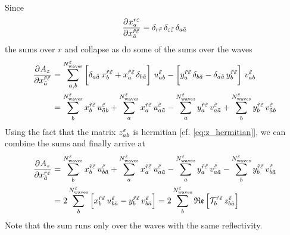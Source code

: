 Since
\begin{equation}
  \label{eq:likelihood_function_par_deriv}
  \dpd{x_a^{r \refl}}{{x_{\tilde{a}}^{\tilde{r} \tilde{\refl}}}}
  = \delta_{r \tilde{r}}\, \delta_{\refl \tilde{\refl}}\, \delta_{a \tilde{a}}
\end{equation}
the sums over $r$ and  collapse as do some of the sums over the waves
\begin{align}
  \dpd{A_z}{{x_{\tilde{a}}^{\tilde{r} \tilde{\refl}}}}
  &= \sum_{a, b}^{N^{\tilde{\refl}}_\text{waves}}
  \sBrk[3]{\delta_{a \tilde{a}}\, x_b^{\tilde{r} \tilde{\refl}}
    + x_a^{\tilde{r} \tilde{\refl}}\, \delta_{b \tilde{a}}}\, u^{\tilde{\refl}}_{a b}
  - \sBrk[3]{y_a^{\tilde{r} \tilde{\refl}}\, \delta_{b \tilde{a}}
    - \delta_{a \tilde{a}}\, y_b^{\tilde{r} \tilde{\refl}}}\, v^{\tilde{\refl}}_{a b} \\
  &= \sum_{b}^{N^{\tilde{\refl}}_\text{waves}} x_b^{\tilde{r} \tilde{\refl}}\, u^{\tilde{\refl}}_{\tilde{a} b}
    + \sum_{a}^{N^{\tilde{\refl}}_\text{waves}} x_a^{\tilde{r} \tilde{\refl}}\, u^{\tilde{\refl}}_{a \tilde{a}}
  - \sum_{a}^{N^{\tilde{\refl}}_\text{waves}} y_a^{\tilde{r} \tilde{\refl}}\, v^{\tilde{\refl}}_{a \tilde{a}}
    + \sum_{b}^{N^{\tilde{\refl}}_\text{waves}} y_b^{\tilde{r} \tilde{\refl}}\, v^{\tilde{\refl}}_{\tilde{a} b}
\end{align}
Using the fact that the matrix $z^\varepsilon_{a b}$ is hermitian
[cf. \cref{eq:z_hermitian}], we can combine the sums and finally arrive
at
\begin{align}
  \dpd{A_z}{{x_{\tilde{a}}^{\tilde{r} \tilde{\refl}}}}
  &= \sum_{b}^{N^{\tilde{\refl}}_\text{waves}} x_b^{\tilde{r} \tilde{\refl}}\, u^{\tilde{\refl}}_{b \tilde{a}}
    + \sum_{a}^{N^{\tilde{\refl}}_\text{waves}} x_a^{\tilde{r} \tilde{\refl}}\, u^{\tilde{\refl}}_{a \tilde{a}}
  - \sum_{a}^{N^{\tilde{\refl}}_\text{waves}} y_a^{\tilde{r} \tilde{\refl}}\, v^{\tilde{\refl}}_{a \tilde{a}}
    - \sum_{b}^{N^{\tilde{\refl}}_\text{waves}} y_b^{\tilde{r} \tilde{\refl}}\, v^{\tilde{\refl}}_{b \tilde{a}} \\
  \label{eq:likelihood_function_sum_term_re_deriv}
  &= 2 \sum_b^{N^{\tilde{\refl}}_\text{waves}} \sBrk{x_b^{\tilde{r} \tilde{\refl}}\, u^{\tilde{\refl}}_{b \tilde{a}}
    - y_b^{\tilde{r} \tilde{\refl}}\, v^{\tilde{\refl}}_{b \tilde{a}}}
  = 2 \sum_b^{N^{\tilde{\refl}}_\text{waves}} \Re\sBrk{\mathcal{T}_b^{\tilde{r} \tilde{\refl}}\, z^{\tilde{\refl}}_{b \tilde{a}}}
\end{align}
Note that the sum runs only over the waves with the same reflectivity.

